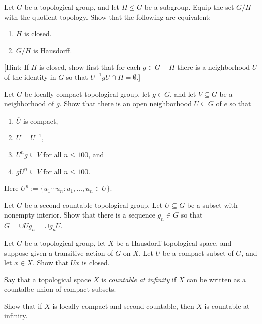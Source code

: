 \documentclass[reqno]{amsart} 
\begin{document}
\begin{exercise}
  Let $G$ be a topological group,
  and let $H \leq G$ be a subgroup.
  Equip the set $G/H$ with the quotient topology.
  Show that the following are equivalent:
  \begin{enumerate}
  \item $H$ is closed.
  \item $G/H$ is Hausdorff.
  \end{enumerate}
  [Hint:
  If $H$ is closed,
  show first that for each $g \in G - H$
  there is a neighborhood $U$ of the identity in $G$
  so that $U^{-1} g U \cap H = \emptyset$.]
\end{exercise}
\begin{exercise}
  Let $G$ be locally compact topological group,
  let $g \in G$,
  and let  $V \subseteq G$ be a neighborhood of $g$.
  Show that there is an open neighborhood
  $U \subseteq G$ of $e$
  so that
  \begin{enumerate}
  \item  $\overline{U}$ is compact,
  \item $U = U^{-1}$,
  \item $U^{n} g \subseteq V$ for all $n \leq 100$, and
  \item $g U^{n} \subseteq V$ for all $n \leq 100$.
  \end{enumerate}
  Here
  $U^{n} := \{u_1 \dotsb u_{n} : u_1,\dotsc,u_{n} \in U\}$.
\end{exercise}
\begin{exercise}
  Let $G$ be a second countable topological group.
  Let $U \subseteq G$ be a subset with nonempty interior.
  Show that there is a sequence $g_n \in G$
  so that $G = \cup U g_n = \cup g_n U$.
\end{exercise}
\begin{exercise}
  Let $G$ be a topological group,
  let $X$ be a Hausdorff  topological space,
  and suppose given a transitive action of $G$ on $X$.
  Let $U$ be a compact subset of $G$,
  and let $x \in X$.
  Show that $U x$ is closed.
\end{exercise}
\begin{exercise}
  Say that a topological space $X$ is \emph{countable at
    infinity}
  if $X$ can be written as a countalbe union of compact subsets.

  Show that if $X$ is locally  compact and second-countable,
  then $X$ is countable at infinity.
\end{exercise}
\end{document}
